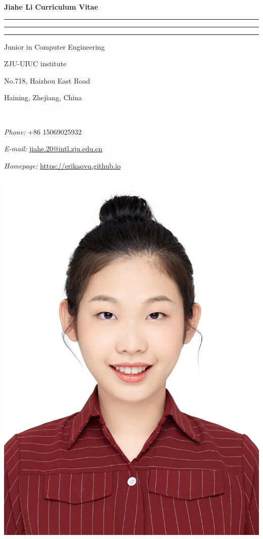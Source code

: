 \documentclass[11pt,english]{article}
\newcommand{\makeheading}[2]%
        {\hspace*{-\marginparsep minus \marginparwidth}%
         \begin{minipage}[t]{\textwidth\marginparwidth\marginparsep}%
         {\LARGE\bfseries #1} \hfill  {\LARGE\bfseries #2 \hspace*{-2.3\marginparsep minus \marginparwidth}}\\[-0.2\baselineskip]%
                 \rule{\textwidth}{1.5pt}\rule{\marginparsep}{1.5pt}\rule{\marginparwidth}{1.5pt}%
         \end{minipage}}
\begin{document}
\makeheading{Jiahe Li}{Curriculum Vitae}


\begin{multicols}{2}

\begin{flushleft}
Junior in Computer Engineering

ZJU-UIUC institute

No.718, Haizhou East Road

Haining, Zhejiang, China


~\       


\textit{Phone:} +86 15069025932

\textit{E-mail:} \href{jiahe.20@intl.zju.edu.cn}{jiahe.20@intl.zju.edu.cn}

\textit{Homepage:} \href{erikaqvq.github.io}{https://erikaqvq.github.io}


\end{flushleft}







\begin{flushright}
   \includegraphics[scale=0.3]{img.jpg} 
\end{flushright}
\end{multicols}
\vspace{-.25in}
\end{document}
